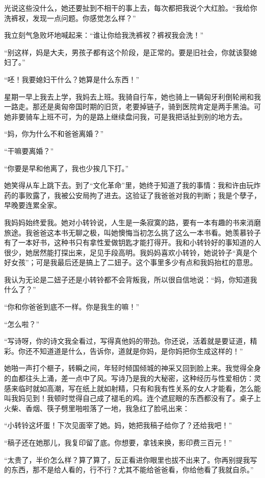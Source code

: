  光说这些没什么，她还要扯到不相干的事上去，每次都把我说个大红脸。“我给你洗裤衩，发现一点问题。你感觉怎么样？” 
 
 我立刻气急败坏地喊起来：“谁让你给我洗裤衩？裤衩我会洗！” 
 
 “别这样，妈是大夫，男孩子都有这个阶段，是正常的。要是旧社会，你就该娶媳妇了。” 
 
 “呸！我要媳妇干什么？她算是什么东西！” 
 
 星期一早上我去上学，我妈去上班。我骑自行车，她也骑上一辆匈牙利倒轮闸和我一路走。那还是奥匈帝国时期的旧货，老要掉链子，骑到医院肯定是两手黑油。可她非要骑车上班不可，为的是路上继续盘问我，可是我把话扯到别的地方去。 
 
 “妈，你为什么不和爸爸离婚？” 
 
 “干嘛要离婚？” 
 
 “你要是早和他离了，我也少挨几下打。” 
 
 她笑得从车上跳下去。到了“文化革命”里，她终于知道了我的事情：我和许由玩炸药的事败露了，我被公安局拘了进去。这验证了我爸爸对我的判断；我是个孽子，早晚要连累全家。 
 
 我妈妈始终爱我。她对小转铃说，人生是一条寂寞的路，要有一本有趣的书来消磨旅途。我爸爸这本书无聊之极，叫她懊悔当初怎么挑了这么一本书看。她羡慕铃子有了一本好书，这种书只有拿性爱做钥匙才能打得开。我和小转铃好的事知道的人很少，她居然能打探出来，足见手段高明。我妈妈喜欢小转铃，她说铃子“真是个好女孩”；可是我最后还是搞上了二妞子。这个事里多少有点和我妈抬杠的意思。 
 
 我认为无论是二妞子还是小转铃都不会背叛我，所以很自信地说：“妈，你知道我什么了？” 
 
 “你和你爸爸到底不一样。你是我生的嘛！” 
 
 “怎么啦？” 
 
 “写诗呀，你的诗文我全看过，写得真他妈的带劲。你还说，活着就是要证道，精彩。你还不知道道是什么，告诉你，道就是你妈，是你妈把你生成这样的！” 
 
 她啪一声打个榧子，转瞬之间，年轻时倾国倾城的神采又回到脸上来。我觉得全身的血都往头上涌，差一点中了风。写诗乃是我的大秘密，这种经历与性爱相仿：灵感来临时就如高潮，写在纸上就如射精，只有和我有性关系的女人才能看，怎么能叫我妈见到！我顿时觉得自己成了褪毛的鸡。连个遮屁眼的东西都没有了。桌子上火柴、香烟、筷子劈里啪啦落了一地，我急红了脸吼出来： 
 
 “小转铃这坏蛋！下次见面宰了她。妈，她把我稿子给你了？还给我吧！” 
 
 “稿子还在她那儿，我复印留了底。你想要，拿钱来换，影印费三百元！” 
 
 “太贵了，半价怎么样？算了算了，反正看进你眼里也拔不出来了。你再别提我写的东西，那不是给人看的，行不行？尤其不能给爸爸看，你给他看了我就自杀。” 
 
